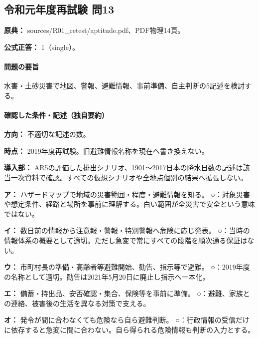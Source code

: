 \subsection{令和元年度再試験 問13}
\label{q:r01-ret-apt-13}

\noindent\textbf{原典：} sources/R01\_retest/aptitude.pdf、PDF物理14頁。

\textbf{公式正答：} 1（single）。

\paragraph{問題の要旨} 水害・土砂災害で地図、警報、避難情報、事前準備、自主判断の5記述を検討する。

\paragraph{確認した条件・記述（独自要約）}\mbox{}\par

\noindent\textbf{方向：} 不適切な記述の数。\par

\noindent\textbf{時点：} 2019年度再試験。旧避難情報名称を現在へ書き換えない。\par

\noindent\textbf{導入部：} AR5の評価した排出シナリオ、1901〜2017日本の降水日数の記述は該当一次資料で確認。すべての仮想シナリオや全地点個別の結果へ拡張しない。\par

\noindent\textbf{ア：} ハザードマップで地域の災害範囲・程度・避難情報を知る。 ○：対象災害や想定条件、経路と場所を事前に理解する。白い範囲が全災害で安全という意味ではない。\par

\noindent\textbf{イ：} 数日前の情報から注意報・警報・特別警報へ危険に応じ発表。 ○：当時の情報体系の概要として適切。ただし急変で常にすべての段階を順次通る保証はない。\par

\noindent\textbf{ウ：} 市町村長の準備・高齢者等避難開始、勧告、指示等で避難。 ○：2019年度の名称として適切。勧告は2021年5月20日に廃止し指示へ一本化。\par

\noindent\textbf{エ：} 備蓄・持出品、安否確認・集合、保険等を事前に準備。 ○：避難、家族との連絡、被害後の生活を異なる対策で支える。\par

\noindent\textbf{オ：} 発令が間に合わなくても危険なら自ら避難判断。 ○：行政情報の受信だけに依存すると急変に間に合わない。自ら得られる危険情報も判断の入力とする。\par

